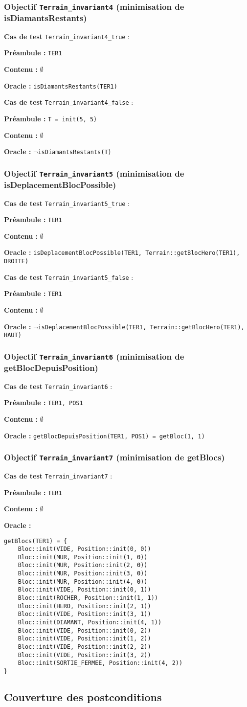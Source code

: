 \documentclass{article}
\newcommand{\cmd}[1]{\texttt{#1}}
\newcommand{\lNOT}{$\lnot$}
\newcommand{\obj}[2]{\subsubsection*{\large{\textbf{Objectif {\cmd{#1} (#2)}}}}}
\newenvironment{cas}[1]
{
	\hspace{1em}\textbf{Cas de test} \cmd{#1} :
	\begin{list}{}{}
}{
	\end{list}\vspace{1em}
}
\newcommand{\pre}[1]{\item \textbf{Préambule :} \cmd{#1}}
\newcommand{\nope}{\item \textbf{Contenu :} $\emptyset$}
\newcommand{\ora}[1]{\item \textbf{Oracle :} \cmd{#1}}
\newcommand{\oram}{\item \textbf{Oracle :}}
\begin{document}
\obj{Terrain\_invariant4} {minimisation de isDiamantsRestants}
	\begin{cas} {Terrain\_invariant4\_true}
		\pre{TER1}
		\nope{}
		\ora{isDiamantsRestants(TER1)}
	\end{cas}

	\begin{cas} {Terrain\_invariant4\_false}
		\pre{T = init(5, 5)}
		\nope{}
		\ora{\lNOT{}isDiamantsRestants(T)}
	\end{cas}

\obj{Terrain\_invariant5} {minimisation de isDeplacementBlocPossible}
	\begin{cas} {Terrain\_invariant5\_true}
		\pre{TER1}
		\nope{}
		\ora{isDeplacementBlocPossible(TER1, Terrain::getBlocHero(TER1), DROITE)}
	\end{cas}

	\begin{cas} {Terrain\_invariant5\_false}
		\pre{TER1}
		\nope{}
		\ora{\lNOT{}isDeplacementBlocPossible(TER1, Terrain::getBlocHero(TER1), HAUT)}
	\end{cas}

\obj{Terrain\_invariant6} {minimisation de getBlocDepuisPosition}
	\begin{cas} {Terrain\_invariant6}
		\pre{TER1, POS1}
		\nope{}
		\ora{getBlocDepuisPosition(TER1, POS1) = getBloc(1, 1)}
	\end{cas}

\obj{Terrain\_invariant7} {minimisation de getBlocs}
	\begin{cas} {Terrain\_invariant7}
		\pre{TER1}
		\nope{}
		\oram{}
		\begin{lstlisting}
getBlocs(TER1) = {
	Bloc::init(VIDE, Position::init(0, 0))
	Bloc::init(MUR, Position::init(1, 0))
	Bloc::init(MUR, Position::init(2, 0))
	Bloc::init(MUR, Position::init(3, 0))
	Bloc::init(MUR, Position::init(4, 0))
	Bloc::init(VIDE, Position::init(0, 1))
	Bloc::init(ROCHER, Position::init(1, 1))
	Bloc::init(HERO, Position::init(2, 1))
	Bloc::init(VIDE, Position::init(3, 1))
	Bloc::init(DIAMANT, Position::init(4, 1))
	Bloc::init(VIDE, Position::init(0, 2))
	Bloc::init(VIDE, Position::init(1, 2))
	Bloc::init(VIDE, Position::init(2, 2))
	Bloc::init(VIDE, Position::init(3, 2))
	Bloc::init(SORTIE_FERMEE, Position::init(4, 2))
}
		\end{lstlisting}
	\end{cas}


\subsection{Couverture des postconditions}
\end{document}
